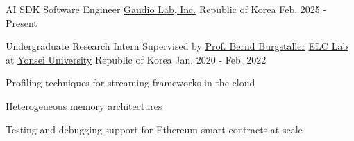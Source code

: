 

\begin{cventries}

  \cventry
    {AI SDK Software Engineer} %
    {\href{https://www.gaudiolab.com}{Gaudio Lab, Inc.}} %
    {Republic of Korea} %
    {Feb. 2025 - Present} %
    {
    }


  \cventry
    {Undergraduate Research Intern Supervised by \href{https://cs.yonsei.ac.kr/bbs/board.php?bo_table=sub2_1_a&wr_id=18}{Prof. Bernd Burgstaller}} %
    {\href{https://elc.yonsei.ac.kr}{ELC Lab} at \href{https://www.yonsei.ac.kr/sc/index.jsp}{Yonsei University}} %
    {Republic of Korea} %
    {Jan. 2020 - Feb. 2022} %
    {
      \begin{cvitems} %
        \item {Profiling techniques for streaming frameworks in the cloud}
        \item {Heterogeneous memory architectures}
        \item {Testing and debugging support for Ethereum smart contracts at scale}
      \end{cvitems}
    }

\end{cventries}
